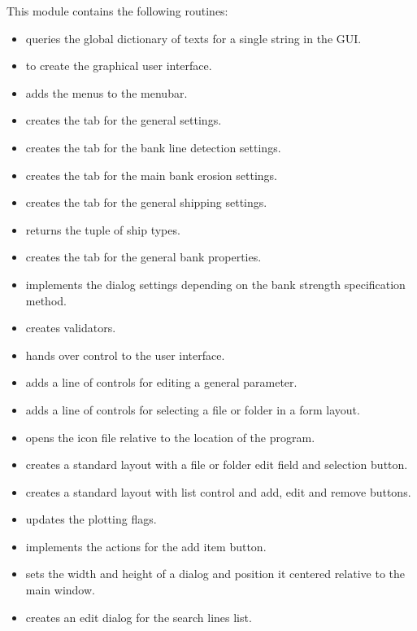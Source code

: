 This module contains the following routines:

\begin{itemize}
\item {} queries the global dictionary of texts for a single string in the GUI.
\item {} to create the graphical user interface.
\item {} adds the menus to the menubar.
\item {} creates the tab for the general settings.
\item {} creates the tab for the bank line detection settings.
\item {} creates the tab for the main bank erosion settings.
\item {} creates the tab for the general shipping settings.
\item {} returns the tuple of ship types.
\item {} creates the tab for the general bank properties.
\item {} implements the dialog settings depending on the bank strength specification method.
\item {} creates validators.
\item {} hands over control to the user interface.
\item {} adds a line of controls for editing a general parameter.
\item {} adds a line of controls for selecting a file or folder in a form layout.
\item {} opens the icon file relative to the location of the program.
\item {} creates a standard layout with a file or folder edit field and selection button.
\item {} creates a standard layout with list control and add, edit and remove buttons.
\item {} updates the plotting flags.
\item {} implements the actions for the add item button.
\item {} sets the width and height of a dialog and position it centered relative to the main window.
\item {} creates an edit dialog for the search lines list.

\end{itemize}
